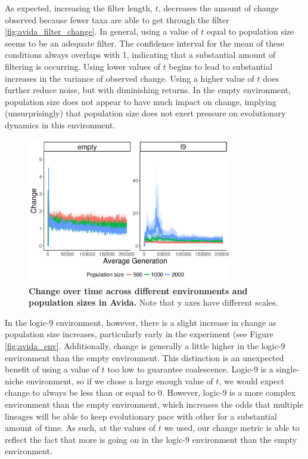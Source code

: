 \documentclass[letterpaper]{article}
\begin{document}
As expected, increasing the filter length, $t$, decreases the amount of change observed because fewer taxa are able to get through the filter \ref{fig:avida_filter_change}. In general, using a value of $t$ equal to population size seems to be an adequate filter. The confidence interval for the mean of these conditions always overlaps with 1, indicating that a substantial amount of filtering is occurring. Using lower values of $t$ begins to lead to substantial increases in the variance of observed change. Using a higher value of $t$ does further reduce noise, but with diminishing returns. In the empty environment, population size does not appear to have much impact on change, implying (unsurprisingly) that population size does not exert pressure on evolutionary dynamics in this environment.

\begin{figure}
    \centering
    \includegraphics[width=3.5in]{figs/avida_env_change.png}
    \caption{\textbf{Change over time across different environments and population sizes in Avida.} Note that y axes have different scales.}
    \label{fig:avida_env_change}
\end{figure}

In the logic-9 environment, however, there is a slight increase in change as population size increases, particularly early in the experiment (see Figure \ref{fig:avida_env}. Additionally, change is generally a little higher in the logic-9 environment than the empty environment. This distinction is an unexpected benefit of using a value of $t$ too low to guarantee coalescence. Logic-9 is a single-niche environment, so if we chose a large enough value of $t$, we would expect change to always be less than or equal to 0. However, logic-9 is a more complex environment than the empty environment, which increases the odds that multiple lineages will be able to keep evolutionary pace with other for a substantial amount of time. As such, at the values of $t$ we used, our change metric is able to reflect the fact that more is going on in the logic-9 environment than the empty environment. 
\end{document}
